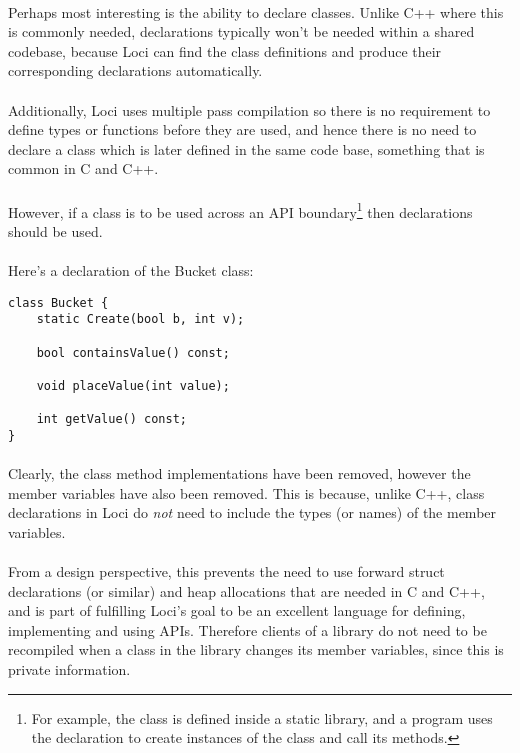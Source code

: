 \documentclass[12pt,twoside,notitlepage]{report}
\begin{document}
\paragraph{}
Perhaps most interesting is the ability to declare classes. Unlike C++ where this is commonly needed, declarations typically won't be needed within a shared codebase, because Loci can find the class definitions and produce their corresponding declarations automatically.

\paragraph{}
Additionally, Loci uses multiple pass compilation so there is no requirement to define types or functions before they are used, and hence there is no need to declare a class which is later defined in the same code base, something that is common in C and C++.

\paragraph{}
However, if a class is to be used across an API boundary\footnote{For example, the class is defined inside a static library, and a program uses the declaration to create instances of the class and call its methods.} then declarations should be used.

\paragraph{}
Here's a declaration of the Bucket class:


\begin{lstlisting}
class Bucket {
	static Create(bool b, int v);

	bool containsValue() const;
	
	void placeValue(int value);
	
	int getValue() const;
}
\end{lstlisting}


\paragraph{}
Clearly, the class method implementations have been removed, however the member variables have also been removed. This is because, unlike C++, class declarations in Loci do \emph{not} need to include the types (or names) of the member variables.

\paragraph{}
From a design perspective, this prevents the need to use forward struct declarations (or similar) and heap allocations that are needed in C and C++, and is part of fulfilling Loci's goal to be an excellent language for defining, implementing and using APIs. Therefore clients of a library do not need to be recompiled when a class in the library changes its member variables, since this is private information.
\end{document}
